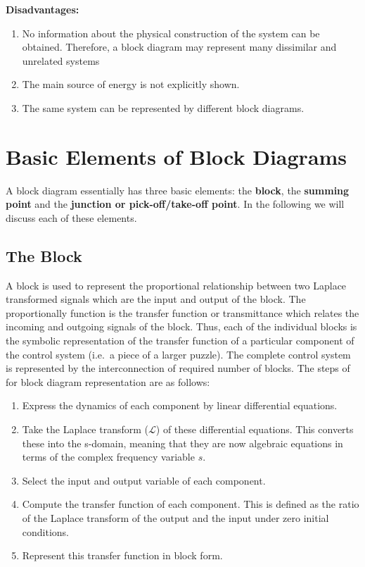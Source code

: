\documentclass[
  14pt,
  a4paper,
  oneside,
  open=any,
  a4paper,
  14pt]{report}
\begin{document}
\textbf{Disadvantages:}

\begin{enumerate}
\def\labelenumi{\arabic{enumi}.}
\item
  No information about the physical construction of the system can be
  obtained. Therefore, a block diagram may represent many dissimilar and
  unrelated systems
\item
  The main source of energy is not explicitly shown.
\item
  The same system can be represented by different block diagrams.
\end{enumerate}

\section{Basic Elements of Block
Diagrams}\label{basic-elements-of-block-diagrams}

A block diagram essentially has three basic elements: the
\textbf{block}, the \textbf{summing point} and the \textbf{junction or
pick-off/take-off point}. In the following we will discuss each of these
elements.

\subsection{The Block}\label{the-block}

A block is used to represent the proportional relationship between two
Laplace transformed signals which are the input and output of the block.
The proportionally function is the transfer function or transmittance
which relates the incoming and outgoing signals of the block. Thus, each
of the individual blocks is the symbolic representation of the transfer
function of a particular component of the control system (i.e.~a piece
of a larger puzzle). The complete control system is represented by the
interconnection of required number of blocks. The steps of for block
diagram representation are as follows:

\begin{enumerate}
\def\labelenumi{\arabic{enumi}.}
\item
  Express the dynamics of each component by linear differential
  equations.
\item
  Take the Laplace transform (\(\mathcal{L}\)) of these differential
  equations. This converts these into the s-domain, meaning that they
  are now algebraic equations in terms of the complex frequency variable
  \(s\).
\item
  Select the input and output variable of each component.
\item
  Compute the transfer function of each component. This is defined as
  the ratio of the Laplace transform of the output and the input under
  zero initial conditions.
\item
  Represent this transfer function in block form.
\end{enumerate}
\end{document}
